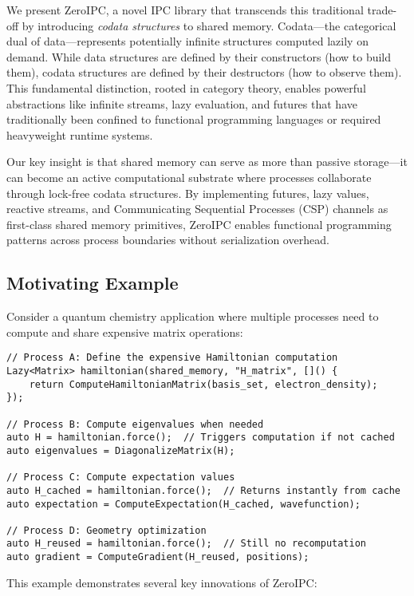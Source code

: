 \documentclass[11pt]{article}
\begin{document}
We present ZeroIPC, a novel IPC library that transcends this traditional trade-off by introducing \emph{codata structures} to shared memory. Codata---the categorical dual of data---represents potentially infinite structures computed lazily on demand. While data structures are defined by their constructors (how to build them), codata structures are defined by their destructors (how to observe them). This fundamental distinction, rooted in category theory, enables powerful abstractions like infinite streams, lazy evaluation, and futures that have traditionally been confined to functional programming languages or required heavyweight runtime systems.

Our key insight is that shared memory can serve as more than passive storage---it can become an active computational substrate where processes collaborate through lock-free codata structures. By implementing futures, lazy values, reactive streams, and Communicating Sequential Processes (CSP) channels as first-class shared memory primitives, ZeroIPC enables functional programming patterns across process boundaries without serialization overhead.

\subsection{Motivating Example}

Consider a quantum chemistry application where multiple processes need to compute and share expensive matrix operations:

\begin{lstlisting}[caption={Cross-Process Lazy Computation in Quantum Chemistry}]
// Process A: Define the expensive Hamiltonian computation
Lazy<Matrix> hamiltonian(shared_memory, "H_matrix", []() {
    return ComputeHamiltonianMatrix(basis_set, electron_density);
});

// Process B: Compute eigenvalues when needed
auto H = hamiltonian.force();  // Triggers computation if not cached
auto eigenvalues = DiagonalizeMatrix(H);

// Process C: Compute expectation values  
auto H_cached = hamiltonian.force();  // Returns instantly from cache
auto expectation = ComputeExpectation(H_cached, wavefunction);

// Process D: Geometry optimization
auto H_reused = hamiltonian.force();  // Still no recomputation
auto gradient = ComputeGradient(H_reused, positions);
\end{lstlisting}

This example demonstrates several key innovations of ZeroIPC:
\end{document}
